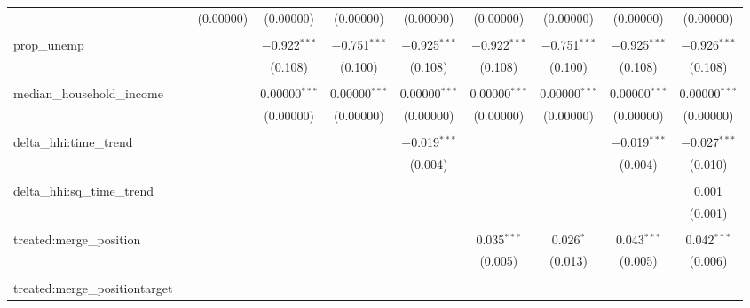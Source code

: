 \begin{table}[H]
{\begin{tabular}{@{\extracolsep{5pt}}lccccccccc}
   &  & (0.00000) & (0.00000) & (0.00000) & (0.00000) & (0.00000) & (0.00000) & (0.00000) & (0.00000) \\  

   & & & & & & & & & \\  

  prop\_unemp &  &  & $-$0.922$^{***}$ & $-$0.751$^{***}$ & $-$0.925$^{***}$ & $-$0.922$^{***}$ & $-$0.751$^{***}$ & $-$0.925$^{***}$ & $-$0.926$^{***}$ \\  

   &  &  & (0.108) & (0.100) & (0.108) & (0.108) & (0.100) & (0.108) & (0.108) \\  

   & & & & & & & & & \\  

  median\_household\_income &  &  & 0.00000$^{***}$ & 0.00000$^{***}$ & 0.00000$^{***}$ & 0.00000$^{***}$ & 0.00000$^{***}$ & 0.00000$^{***}$ & 0.00000$^{***}$ \\  

   &  &  & (0.00000) & (0.00000) & (0.00000) & (0.00000) & (0.00000) & (0.00000) & (0.00000) \\  

   & & & & & & & & & \\  

  delta\_hhi:time\_trend &  &  &  &  & $-$0.019$^{***}$ &  &  & $-$0.019$^{***}$ & $-$0.027$^{***}$ \\  

   &  &  &  &  & (0.004) &  &  & (0.004) & (0.010) \\  

   & & & & & & & & & \\  

  delta\_hhi:sq\_time\_trend &  &  &  &  &  &  &  &  & 0.001 \\  

   &  &  &  &  &  &  &  &  & (0.001) \\  

   & & & & & & & & & \\  

  treated:merge\_position &  &  &  &  &  & 0.035$^{***}$ & 0.026$^{*}$ & 0.043$^{***}$ & 0.042$^{***}$ \\  

   &  &  &  &  &  & (0.005) & (0.013) & (0.005) & (0.006) \\  

   & & & & & & & & & \\  

  treated:merge\_positiontarget &  &  &  &  &  &  &  &  &  \\  


\end{tabular}}
\end{table}
